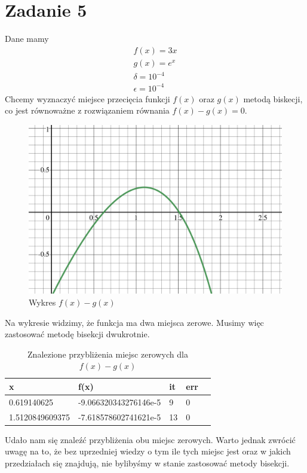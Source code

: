 \documentclass{article}
\begin{document}
\section*{Zadanie 5}
Dane mamy
\begin{gather*}
f(x)=3x\\
g(x)=e^x\\
\delta=10^{-4}\\
\epsilon=10^{-4}
\end{gather*}
Chcemy wyznaczyć miejsce przecięcia funkcji $f(x)$ oraz $g(x)$
metodą biskecji, co jest równoważne z rozwiązaniem równania $f(x)-g(x)=0$.
\begin{figure}[H]
  \centering
  \includegraphics[width=\textwidth]{./ex5.png}
  \caption{Wykres $f(x)-g(x)$}
\end{figure}
Na wykresie widzimy, że funkcja ma dwa miejsca zerowe.
Musimy więc zastosować metodę bisekcji dwukrotnie.
\begin{table}[h]
  \centering
  \begin{tabular}{|l|l|l|l|l|}
  \hline
  \textbf{x}            & \textbf{f(x)}                      & \textbf{it} & \textbf{err} \\ \hline
  0.619140625           & -9.066320343276146e-5              & 9           & 0            \\ \hline
  1.5120849609375       & -7.618578602741621e-5              & 13          & 0            \\ \hline
  \end{tabular}
  \caption{Znalezione przybliżenia miejsc zerowych dla $f(x)-g(x)$}
\end{table}
Udało nam się znaleźć przybliżenia obu miejsc zerowych. Warto jednak
zwrócić uwagę na to, że bez uprzedniej wiedzy o tym ile tych miejsc jest
oraz w jakich przedziałach się znajdują, nie bylibyśmy w stanie
zastosować metody bisekcji.
\end{document}
